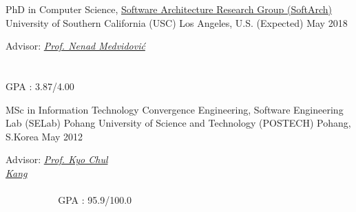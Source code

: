 

\begin{cventries}

  \cventry
    {PhD in Computer Science, \href{http://softarch.usc.edu/} {Software Architecture Research Group (SoftArch)}} %
    {University of Southern California (USC)} %
    {Los Angeles, U.S.} %
	{(Expected) May 2018} %
    {
      \begin{cvitems} %
       	\item Advisor: {\em \href{http://sunset.usc.edu/~neno/}{Prof. Nenad Medvidović} ~~~~~~~~~~~~~~~~~~~~~~~~~~~~~~~~~~~~~~~~~~~~~~~~~~~~~~~~~~~~~~~~~~~~~~~~~~~~~~~~~~~~~~~~~~~~~~~~~~~~~~~~~~~~~~~~~~~~~~~~~~~~~~~~~~~~~~~~~~~}GPA : 3.87/4.00
      \end{cvitems}
    }
    
  \cventry
  {MSc in Information Technology Convergence Engineering, {Software Engineering Lab (SELab)}} %
  {Pohang University of Science and Technology (POSTECH)} %
  {Pohang, S.Korea} %
  {May 2012} %
  {
     	\begin{cvitems} %
     		\item Advisor: {\em \href{http://cse.postech.ac.kr/prof/kck/}{Prof. Kyo Chul Kang}~~~~~~~~~~~~~~~~~~~~~~~~~~~~~~~~~~~~~~~~~~~~~~~~~~~~~~~~~~~~~~~~~~~~~~~~~~~~~~~~~~~~~~~~~~~~~~~~~~~~~~~~~~~~~~~~~~~~~~~~~~~~~~~~~~~~~~~~~~~~~~~~~~} GPA : 95.9/100.0
     	\end{cvitems}
  }
  

\end{cventries}
